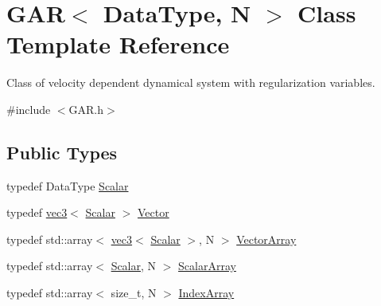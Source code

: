 \hypertarget{class_g_a_r}{}\section{G\+AR$<$ Data\+Type, N $>$ Class Template Reference}
\label{class_g_a_r}


Class of velocity dependent dynamical system with regularization variables.  




{\ttfamily \#include $<$G\+A\+R.\+h$>$}

\subsection*{Public Types}
\begin{DoxyCompactItemize}
\item 
typedef Data\+Type \mbox{\hyperlink{class_g_a_r_a2ae44eda8e28d5dd26cf707dcda69314}{Scalar}}
\item 
typedef \mbox{\hyperlink{structvec3}{vec3}}$<$ \mbox{\hyperlink{class_g_a_r_a2ae44eda8e28d5dd26cf707dcda69314}{Scalar}} $>$ \mbox{\hyperlink{class_g_a_r_ad2f5b930feb3831a717f96155b3ff74e}{Vector}}
\item 
typedef std\+::array$<$ \mbox{\hyperlink{structvec3}{vec3}}$<$ \mbox{\hyperlink{class_g_a_r_a2ae44eda8e28d5dd26cf707dcda69314}{Scalar}} $>$, N $>$ \mbox{\hyperlink{class_g_a_r_a5818e17eb203504af6e10f38fc38d378}{Vector\+Array}}
\item 
typedef std\+::array$<$ \mbox{\hyperlink{class_g_a_r_a2ae44eda8e28d5dd26cf707dcda69314}{Scalar}}, N $>$ \mbox{\hyperlink{class_g_a_r_a0b446684ae922457a3bf86c904085d8a}{Scalar\+Array}}
\item 
typedef std\+::array$<$ size\+\_\+t, N $>$ \mbox{\hyperlink{class_g_a_r_aaf033049c0cd8f0f86a82b9595086fa5}{Index\+Array}}
\end{DoxyCompactItemize}
